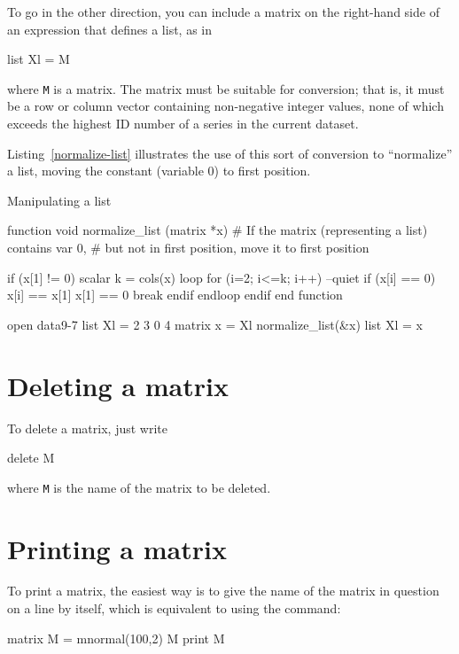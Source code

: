 To go in the other direction, you can include a matrix on the
right-hand side of an expression that defines a list, as in
%
\begin{code}
list Xl = M
\end{code}
%
where \texttt{M} is a matrix.  The matrix must be suitable for
conversion; that is, it must be a row or column vector containing
non-negative integer values, none of which exceeds the highest ID
number of a series in the current dataset.

Listing~\ref{normalize-list} illustrates the use of this sort of
conversion to ``normalize'' a list, moving the constant (variable 0)
to first position.

\begin{script}[htbp]
  \caption{Manipulating a list}
  \label{normalize-list}
\begin{scode}
function void normalize_list (matrix *x)
  # If the matrix (representing a list) contains var 0,
  # but not in first position, move it to first position

  if (x[1] != 0)
     scalar k = cols(x)
     loop for (i=2; i<=k; i++) --quiet
        if (x[i] == 0)
            x[i] == x[1]
            x[1] == 0
            break
         endif
     endloop
  endif
end function

open data9-7
list Xl = 2 3 0 4
matrix x = Xl
normalize_list(&x)
list Xl = x
\end{scode}
\end{script}


\section{Deleting a matrix}
\label{matrix-delete}

To delete a matrix, just write
%
\begin{code}
delete M
\end{code}
%
where \texttt{M} is the name of the matrix to be deleted.

\section{Printing a matrix}

To print a matrix, the easiest way is to give the name of the matrix
in question on a line by itself, which is equivalent to using the
 command:
%
\begin{code}
matrix M = mnormal(100,2)
M
print M
\end{code}


